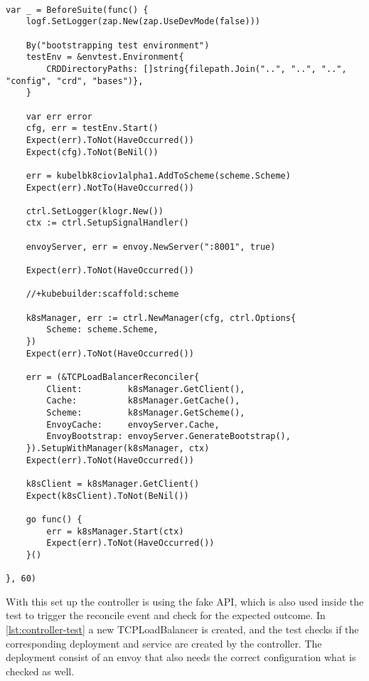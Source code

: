 \begin{lstlisting}[caption={TCPLoadBalancer controller integration test}, label={lst:controller-test-setup}]

var _ = BeforeSuite(func() {
    logf.SetLogger(zap.New(zap.UseDevMode(false)))

    By("bootstrapping test environment")
    testEnv = &envtest.Environment{
        CRDDirectoryPaths: []string{filepath.Join("..", "..", "..", "config", "crd", "bases")},
    }

    var err error
    cfg, err = testEnv.Start()
    Expect(err).ToNot(HaveOccurred())
    Expect(cfg).ToNot(BeNil())

    err = kubelbk8ciov1alpha1.AddToScheme(scheme.Scheme)
    Expect(err).NotTo(HaveOccurred())

    ctrl.SetLogger(klogr.New())
    ctx := ctrl.SetupSignalHandler()

    envoyServer, err = envoy.NewServer(":8001", true)

    Expect(err).ToNot(HaveOccurred())

    //+kubebuilder:scaffold:scheme

    k8sManager, err := ctrl.NewManager(cfg, ctrl.Options{
        Scheme: scheme.Scheme,
    })
    Expect(err).ToNot(HaveOccurred())

    err = (&TCPLoadBalancerReconciler{
        Client:         k8sManager.GetClient(),
        Cache:          k8sManager.GetCache(),
        Scheme:         k8sManager.GetScheme(),
        EnvoyCache:     envoyServer.Cache,
        EnvoyBootstrap: envoyServer.GenerateBootstrap(),
    }).SetupWithManager(k8sManager, ctx)
    Expect(err).ToNot(HaveOccurred())

    k8sClient = k8sManager.GetClient()
    Expect(k8sClient).ToNot(BeNil())

    go func() {
        err = k8sManager.Start(ctx)
        Expect(err).ToNot(HaveOccurred())
    }()

}, 60)
\end{lstlisting}

With this set up the controller is using the fake API, which is also used inside the test to trigger the reconcile event and check for the expected outcome.
In \autoref{lst:controller-test} a new TCPLoadBalancer is created, and the test checks if the corresponding deployment and service are created by the controller.
The deployment consist of an envoy that also needs the correct configuration what is checked as well.

